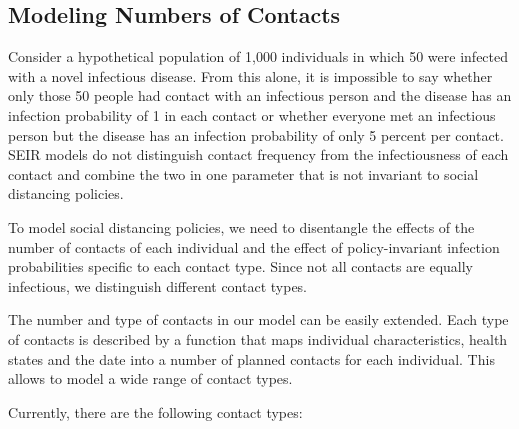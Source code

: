 \subsection{Modeling Numbers of Contacts}
\label{sec:number_of_contacts}

Consider a hypothetical population of 1,000 individuals in which 50 were infected with a
novel infectious disease. From this alone, it is impossible to say whether only
those 50 people had contact with an infectious person and the disease has an infection
probability of 1 in each contact or whether everyone met an infectious person but the
disease has an infection probability of only 5 percent per contact. SEIR models do not
distinguish contact frequency from the infectiousness of each contact and
combine the two in one parameter that is not invariant to social distancing policies.

To model social distancing policies, we need to disentangle the effects of the number of
contacts of each individual and the effect of policy-invariant infection probabilities
specific to each contact type. Since not all contacts are equally infectious, we
distinguish different contact types.

The number and type of contacts in our model can be easily extended. Each type of
contacts is described by a function that maps individual characteristics, health states
and the date into a number of planned contacts for each individual. This allows to model
a wide range of contact types.

Currently, there are the following contact types:

